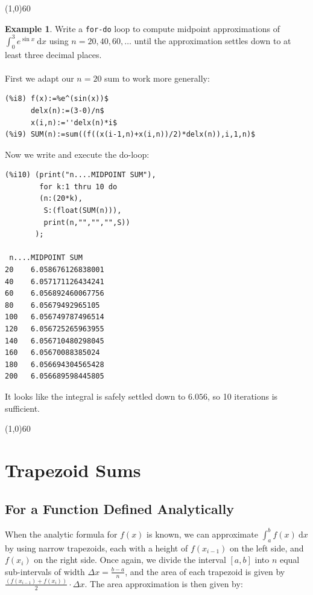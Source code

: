 \documentclass[10.5pt,twoside]{report}
\theoremstyle{definition}
\newtheorem{exmp}{Example}[section]
\begin{document}
\line(1,0){60}
\linethickness{0.5mm}



\begin{exmp} Write a \verb|for-do| loop to compute midpoint approximations of $\displaystyle \int_0^3 e^{\sin{x}}\ \mathrm{d}x$ using $n=20,40,60,\dots $ until the approximation settles down to at least three decimal places.\\
${}$\\
First we adapt our $n=20$ sum to work more generally:

\begin{verbatim}
(%i8) f(x):=%e^(sin(x))$
      delx(n):=(3-0)/n$
      x(i,n):=''delx(n)*i$
(%i9) SUM(n):=sum((f((x(i-1,n)+x(i,n))/2)*delx(n)),i,1,n)$
\end{verbatim}

Now we write and execute the do-loop:

\begin{verbatim}
(%i10) (print("n....MIDPOINT SUM"),
        for k:1 thru 10 do
        (n:(20*k),
         S:(float(SUM(n))),
         print(n,"","","",S))
       );
       
 n....MIDPOINT SUM
20    6.058676126838001
40    6.057171126434241
60    6.056892460067756
80    6.05679492965105
100   6.056749787496514
120   6.056725265963955
140   6.056710480298045
160   6.05670088385024
180   6.056694304565428
200   6.056689598445805
\end{verbatim}

It looks like the integral is safely settled down to $6.056$, so 10 iterations is sufficient.


\end{exmp}

\line(1,0){60}
\linethickness{0.5mm}
\pagebreak



\pagebreak
\section{Trapezoid Sums}\label{Trapezoid Sums}
\subsection{For a Function Defined Analytically}

When the analytic formula for $f(x)$ is known, we can approximate $\displaystyle \int_a^b f(x)\ \mathrm{d}x$ by using narrow trapezoids, each with a height of $f(x_{i-1})$ on the left side, and $f(x_i)$ on the right side.  Once again, we divide the interval $[a,b]$ into $n$ equal sub-intervals of width $\Delta x = \frac{b-a}{n}$, and the area of each trapezoid is given by $\frac{\left(f(x_{i-1})+f(x_i)\right)}{2}\cdot \Delta x$.  The area approximation is then given by:
\end{document}
